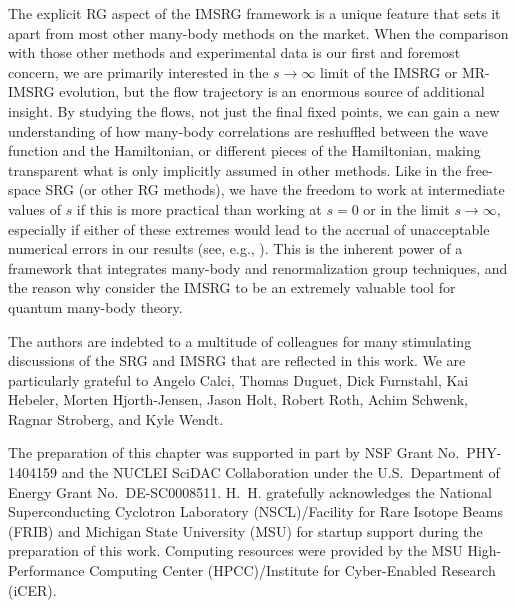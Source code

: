 {The explicit RG aspect of the IMSRG framework is a unique feature
that sets it apart from most other many-body methods on the market. 
When the comparison with 
those other methods and experimental data is our first and foremost 
concern, we are primarily interested in the $s\to\infty$ limit of the 
IMSRG or MR-IMSRG evolution, but the flow trajectory is an enormous 
source of additional insight. By studying the flows, not just the
final fixed points, we can gain a new understanding of how many-body 
correlations are reshuffled between the wave function and the Hamiltonian, 
or different pieces of 
the Hamiltonian, making transparent what is only implicitly assumed 
in other methods. Like in the free-space SRG (or other RG methods), we 
have the freedom to work at intermediate values of $s$ if this is more 
practical than working at $s=0$ or in the limit 
$s\to\infty$, especially if either of these extremes would lead to the 
accrual of unacceptable numerical errors in our results (see, e.g., 
\cite{Gebrerufael:2016rp,Li:2015nq,Li:2016rm}). 
This is the inherent power of a framework that integrates many-body and 
renormalization group techniques, and the reason why consider the IMSRG 
to be an extremely valuable tool for quantum many-body theory.



\begin{acknowledgement}
The authors are indebted to a multitude of colleagues for many stimulating 
discussions of the SRG and IMSRG that are reflected in this work. We are
particularly grateful to Angelo Calci, Thomas Duguet, Dick Furnstahl, 
Kai Hebeler, Morten Hjorth-Jensen, Jason Holt, Robert Roth, Achim Schwenk, 
Ragnar Stroberg, and Kyle Wendt.

The preparation of this chapter was supported in part by NSF Grant No.~PHY-1404159 
and the NUCLEI SciDAC Collaboration under the U.S.~Department of Energy Grant 
No.~DE-SC0008511. H.~H. gratefully acknowledges the National Superconducting 
Cyclotron Laboratory (NSCL)/Facility for Rare Isotope Beams (FRIB) and Michigan 
State University (MSU) for startup support during the preparation of this work.
Computing resources were provided by the MSU High-Performance Computing Center 
(HPCC)/Institute for Cyber-Enabled Research (iCER).
\end{acknowledgement}

}
